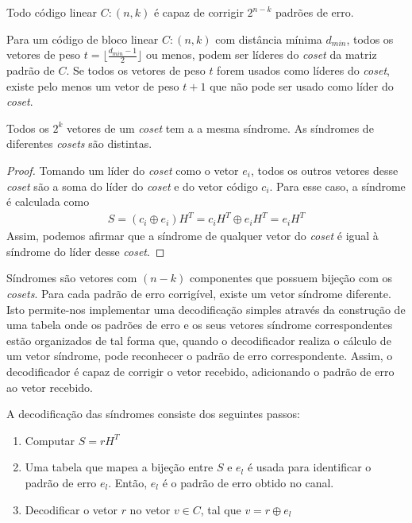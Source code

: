 \begin{theorem} Todo código linear $C:(n,k)$ é capaz de corrigir $2^{n-k}$ padrões de erro.
\end{theorem}

\begin{theorem} Para um código de bloco linear $C:(n,k)$ com distância mínima $d_{min}$, todos os vetores de peso $t=\lfloor \frac{d_{min}-1}{2}\rfloor$ ou menos, podem ser líderes do \emph{coset} da matriz padrão de $C$. Se todos os vetores de peso $t$ forem usados como líderes do \emph{coset}, existe pelo menos um vetor de peso $t+1$ que não pode ser usado como líder do \emph{coset}.
\end{theorem}

\begin{theorem} Todos os $2^k$ vetores de um \emph{coset} tem a a mesma síndrome. As síndromes de diferentes  \emph{cosets} são distintas.
\end{theorem}

\begin{proof}
Tomando um líder do \emph{coset} como o vetor $e_i$, todos os outros vetores desse \emph{coset} são a soma do líder do \emph{coset} e do vetor código $c_i$. Para esse caso, a síndrome é calculada como
\begin{align*}
S = (c_i \oplus e_i)H^T = c_i H^T \oplus e_i H^T = e_i H^T
\end{align*}
Assim, podemos afirmar que a síndrome de qualquer vetor do \emph{coset} é igual à síndrome do líder desse \emph{coset}.
\end{proof}

Síndromes são vetores com $(n-k)$ componentes que possuem bijeção com os \emph{cosets}. Para cada padrão de erro corrigível, existe um vetor
síndrome diferente. Isto permite-nos implementar uma decodificação simples através da construção de uma tabela onde os padrões de erro e os seus vetores
síndrome correspondentes estão organizados de tal forma que, quando o decodificador realiza o cálculo de um vetor síndrome, pode reconhecer o padrão de erro correspondente. Assim, o decodificador é capaz de corrigir o vetor recebido, adicionando o padrão de erro ao vetor recebido.

A decodificação das síndromes consiste dos seguintes passos:

\begin{enumerate}
   \item Computar $S=rH^T$
   \item Uma tabela que mapea a bijeção entre $S$ e $e_l$ é usada para identificar o padrão de erro $e_l$. Então, $e_l$ é o padrão de erro obtido no canal.
   \item Decodificar o vetor $r$ no vetor $v \in C$, tal que $v=r \oplus e_l$ 
\end{enumerate}

